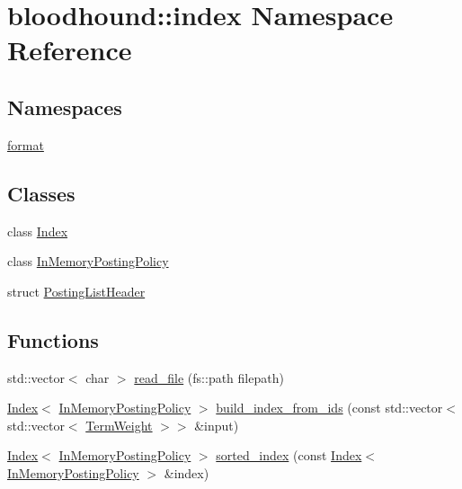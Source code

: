 \hypertarget{namespacebloodhound_1_1index}{}\section{bloodhound\+:\+:index Namespace Reference}
\label{namespacebloodhound_1_1index}
\subsection*{Namespaces}
\begin{DoxyCompactItemize}
\item 
 \hyperlink{namespacebloodhound_1_1index_1_1format}{format}
\end{DoxyCompactItemize}
\subsection*{Classes}
\begin{DoxyCompactItemize}
\item 
class \hyperlink{classbloodhound_1_1index_1_1Index}{Index}
\item 
class \hyperlink{classbloodhound_1_1index_1_1InMemoryPostingPolicy}{In\+Memory\+Posting\+Policy}
\item 
struct \hyperlink{structbloodhound_1_1index_1_1PostingListHeader}{Posting\+List\+Header}
\end{DoxyCompactItemize}
\subsection*{Functions}
\begin{DoxyCompactItemize}
\item 
std\+::vector$<$ char $>$ \hyperlink{namespacebloodhound_1_1index_a4b6f89a17c10bf2927aff24df7081bb3}{read\+\_\+file} (fs\+::path filepath)
\item 
\hyperlink{classbloodhound_1_1index_1_1Index}{Index}$<$ \hyperlink{classbloodhound_1_1index_1_1InMemoryPostingPolicy}{In\+Memory\+Posting\+Policy} $>$ \hyperlink{namespacebloodhound_1_1index_ac508959a4f3ab5ce65d62f1c294359e2}{build\+\_\+index\+\_\+from\+\_\+ids} (const std\+::vector$<$ std\+::vector$<$ \hyperlink{structbloodhound_1_1TermWeight}{Term\+Weight} $>$$>$ \&input)
\item 
\hyperlink{classbloodhound_1_1index_1_1Index}{Index}$<$ \hyperlink{classbloodhound_1_1index_1_1InMemoryPostingPolicy}{In\+Memory\+Posting\+Policy} $>$ \hyperlink{namespacebloodhound_1_1index_a306f62c55e8d06a9703f552f7cf312c5}{sorted\+\_\+index} (const \hyperlink{classbloodhound_1_1index_1_1Index}{Index}$<$ \hyperlink{classbloodhound_1_1index_1_1InMemoryPostingPolicy}{In\+Memory\+Posting\+Policy} $>$ \&index)
\end{DoxyCompactItemize}


